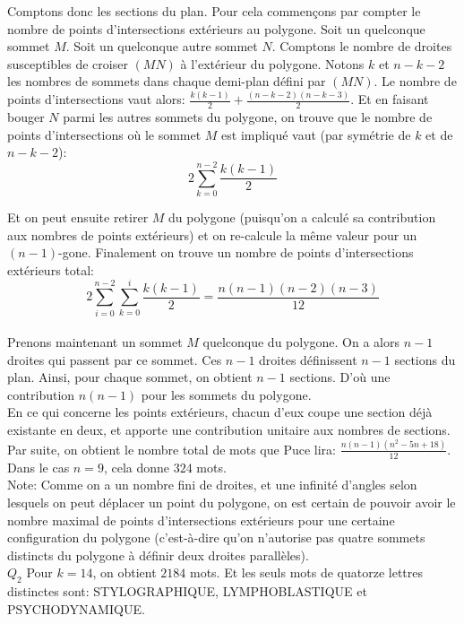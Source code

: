 \documentclass[11pt] {article}
\begin{document}
Comptons donc les sections du plan. Pour cela commençons par compter le nombre
de points d'intersections extérieurs au polygone. Soit un quelconque sommet $M$.
Soit un quelconque autre sommet $N$. Comptons le nombre de droites susceptibles
de croiser $(MN)$ à l'extérieur du polygone. Notons $k$ et $n-k-2$ les nombres
de sommets dans chaque demi-plan défini par $(MN)$. Le nombre de points
d'intersections vaut alors: $\frac{k(k-1)}{2} + \frac{(n-k-2)(n-k-3)}{2}$. Et en
faisant bouger $N$ parmi les autres sommets du polygone, on trouve que le nombre
de points d'intersections où le sommet $M$ est impliqué vaut (par symétrie de $k$
et de $n-k-2$):
\[ 2 \sum\limits_{k=0}^{n-2} \frac{k(k-1)}{2}\]

Et on peut ensuite retirer $M$ du polygone (puisqu'on a calculé sa contribution
aux nombres de points extérieurs) et on re-calcule la même valeur pour un 
$(n-1)$-gone. Finalement on trouve un nombre de points d'intersections extérieurs total:
\[2\sum\limits_{i=0}^{n-2} \sum\limits_{k=0}^i \frac{k(k-1)}{2} = \frac{n(n-1)(n-2)(n-3)}{12}\]\\

Prenons maintenant un sommet $M$ quelconque du polygone. On a alors $n-1$ droites
qui passent par ce sommet. Ces $n-1$ droites définissent $n-1$ sections du plan.
Ainsi, pour chaque sommet, on obtient $n-1$ sections. D'où une contribution
$n(n-1)$ pour les sommets du polygone.\\
En ce qui concerne les points extérieurs, chacun d'eux coupe une section déjà
existante en deux, et apporte une contribution unitaire aux nombres de sections.\\

Par suite, on obtient le nombre total de mots que Puce lira: $\frac{n(n-1)(n^2-5n+18)}{12}$.
Dans le cas $n=9$, cela donne $324$ mots.\\


Note: Comme on a un nombre fini de droites, et une infinité d'angles selon lesquels
on peut déplacer un point du polygone, on est certain de pouvoir avoir le
nombre maximal de points d'intersections extérieurs pour une certaine configuration
du polygone (c'est-à-dire qu'on n'autorise pas quatre sommets distincts du polygone
à définir deux droites parallèles).\\

$Q_{2}$ Pour $k = 14$, on obtient $2184$ mots. Et les seuls mots de quatorze lettres
distinctes sont: STYLOGRAPHIQUE, LYMPHOBLASTIQUE et PSYCHODYNAMIQUE.
\end{document}
